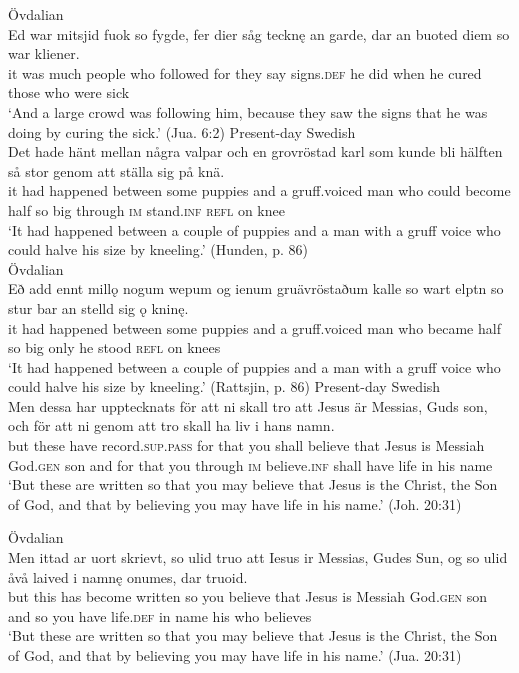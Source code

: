 \documentclass[output=paper]{langscibook}
\begin{document}
\ex Övdalian\label{ex:kalm:27b}\\
\gll Ed war mitsjid fuok so fygde, fer dier såg tecknę an garde, dar an buoted diem so war kliener.\\
 it was much people who followed for they say signs.\textsc{def} he did when he cured those who were sick\\
\glt ‘And a large crowd was following him, because they saw the signs that he was doing by curing the sick.’ (Jua. 6:2)
\z
\ex
\label{ex:kalm:28}
\ea Present-day Swedish\label{ex:kalm:28a}\\
\gll Det hade hänt mellan några valpar och en grovröstad karl som kunde bli hälften så stor genom att ställa sig på knä.\\
 it had happened between some puppies and a gruff.voiced man who could become half so big through \textsc{im} stand.\textsc{inf} \textsc{refl} on knee\\
\glt ‘It had happened between a couple of puppies and a man with a gruff voice who could halve his size by kneeling.’ (Hunden, p. 86)\\

\ex Övdalian\label{ex:kalm:28b}\\ 
\gll Eð add ennt millǫ nogum wepum og ienum gruävröstaðum kalle so wart elptn so stur bar an stelld sig ǫ kninę.\\
it had happened between some puppies and a gruff.voiced man who became half so big only he stood \textsc{refl} on knees\\
\glt ‘It had happened between a couple of puppies and a man with a gruff voice who could halve his size by kneeling.’ (Rattsjin, p. 86)
\z 
\ex
\label{ex:kalm:29}
\ea Present-day Swedish \label{ex:kalm:29a}\\
\gll Men dessa har upptecknats för att ni skall tro att Jesus är Messias, Guds son, och för att ni genom att tro skall ha liv i hans namn.\\
but these have record.\textsc{sup.pass} for that you shall believe that Jesus is Messiah God.\textsc{gen} son and for that you through \textsc{im} believe.\textsc{inf} shall have life in his name \\
\glt ‘But these are written so that you may believe that Jesus is the Christ, the Son of God, and that by believing you may have life in his name.’ (Joh. 20:31)

\ex Övdalian\label{ex:kalm:29b}\\ 
\gll Men ittad ar uort skrievt, so ulid truo att Iesus ir Messias, Gudes Sun, og so ulid åvå laived i namnę onumes, dar truoid.\\
 but this has become written so you believe that Jesus is Messiah God.\textsc{gen} son and so you have life.\textsc{def} in name his who believes\\
\glt ‘But these are written so that you may believe that Jesus is the Christ, the Son of God, and that by believing you may have life in his name.’ (Jua. 20:31)
\z
\z 
\end{document}
